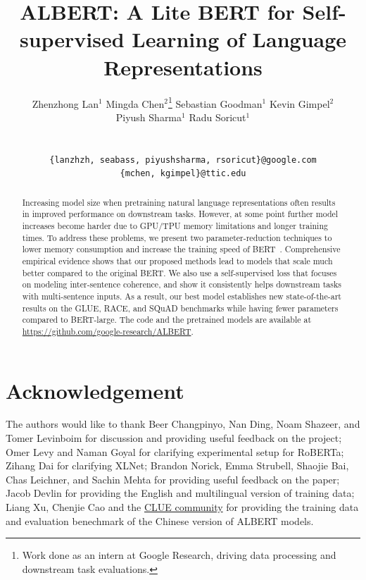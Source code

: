 \documentclass{article} %
\title{ALBERT: A Lite BERT for Self-supervised Learning of Language Representations}
\author{
    \begin{tabular}[t]{c} 
        Zhenzhong Lan$^{1}$ \hspace{15pt} Mingda Chen$^{2}$\thanks{Work done as an intern at Google Research, driving data processing and downstream task evaluations.} \hspace{15pt} Sebastian Goodman$^{1}$ \hspace{15pt} Kevin Gimpel$^{2}$ \\[1.5ex]
        Piyush Sharma$^{1}$ \hspace{15pt} Radu Soricut$^{1}$ \\[1.5ex]
    \end{tabular} 
    \\
    \text{\hspace{50pt} $^{1}$Google Research \hspace{30pt} $^{2}$Toyota Technological Institute at Chicago} \\[1.5ex]
    \texttt{\hspace{30pt}\{lanzhzh, seabass, piyushsharma, rsoricut\}@google.com} \\
    \texttt{\hspace{100pt}\{mchen, kgimpel\}@ttic.edu} \\
}
\newcommand{\squad}{SQuAD\xspace}
\begin{document}
\maketitle

\begin{abstract}
Increasing model size when pretraining natural language representations often results in improved performance on downstream tasks. However, at some point further model increases become harder due to GPU/TPU memory limitations and longer training times. To address these problems,  we present two parameter-reduction techniques to lower memory consumption and increase the training speed of BERT~\citep{devlin2018bert}. Comprehensive empirical evidence shows that our proposed methods lead to models that scale much better compared to the original BERT. We also use a self-supervised loss that focuses on modeling inter-sentence coherence, and show it consistently helps downstream tasks with multi-sentence inputs. As a result, our best model establishes new state-of-the-art results on the GLUE, RACE, and \squad benchmarks while having fewer parameters compared to BERT-large. The code and the pretrained models are available at \url{ https://github.com/google-research/ALBERT}.
\end{abstract}

 





\section*{Acknowledgement}
The authors would like to thank Beer Changpinyo, Nan Ding, Noam Shazeer, and Tomer Levinboim for discussion and providing useful feedback on the project; Omer Levy and Naman Goyal for clarifying experimental setup for RoBERTa;  Zihang Dai for clarifying XLNet; Brandon Norick, Emma Strubell, Shaojie Bai, Chas Leichner, and Sachin Mehta for providing useful feedback on the paper; Jacob Devlin for providing the English and multilingual version of training data; Liang Xu, Chenjie Cao and the \href{https://github.com/CLUEbenchmark/CLUE}{CLUE community} for providing the training data and evaluation benechmark of the Chinese version of ALBERT models. 



\appendix

\end{document}
